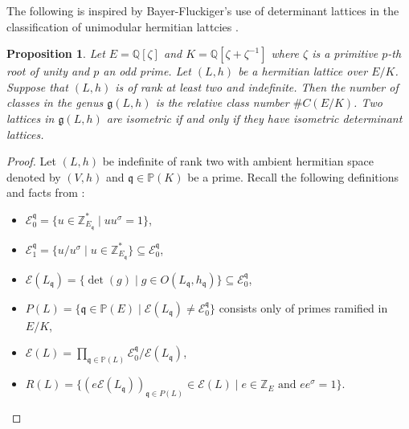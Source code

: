 \documentclass{amsart}
\theoremstyle{definition}
\theoremstyle{plain}
\newtheorem{proposition}[definition]{Proposition}
\newcommand{\QQ}{\mathbb{Q}}
\newcommand{\ZZ}{\mathbb{Z}}
\begin{document}
The following is inspired by Bayer-Fluckiger's use of determinant lattices in the
classification of unimodular hermitian lattcies \cite{fluckiger:unimodular}.
\begin{proposition}\label{prop:genus2}
 Let $E = \QQ[\zeta]$ and $K=\QQ[\zeta + \zeta^{-1}]$ where $\zeta$ is a primitive $p$-th root of unity and $p$ an odd prime.
 Let $(L,h)$ be a hermitian lattice over $E/K$. Suppose that $(L,h)$ is of rank at least two and indefinite.
 Then the number of classes in the genus $\mathfrak{g}(L,h)$ is the relative class number $\#C(E/K)$.
 Two lattices in $\mathfrak{g}(L,h)$ are isometric if and only if they have isometric determinant lattices.
\end{proposition}
\begin{proof}
Let $(L,h)$ be indefinite of rank two with ambient hermitian space denoted by $(V,h)$ and
 $\mathfrak{q} \in \mathbb{P}(K)$ be a prime. Recall the following definitions and facts from \cite{kirschmer:determinants}:
\begin{itemize}
\setlength{\itemsep}{2pt}
 \item $\mathcal{E}_0^\mathfrak{q}=\{u \in \ZZ_{E_\mathfrak{q}}^* \mid uu^\sigma =1\}$,
 \item $\mathcal{E}_1^\mathfrak{q}=\{u/u^{\sigma} \mid u \in \ZZ_{E_\mathfrak{q}}^*\} \subseteq \mathcal{E}_0^\mathfrak{q}$,
 \item $\mathcal{E}(L_\mathfrak{q})=\{\det(g) \mid g \in O(L_\mathfrak{q},h_\mathfrak{q}) \}\subseteq \mathcal{E}_0^\mathfrak{q}$,
 \item $P(L)=\{\mathfrak{q} \in \mathbb{P}(E) \mid \mathcal{E}(L_\mathfrak{q}) \neq \mathcal{E}_0^\mathfrak{q}\}$ consists only of primes ramified in $E/K$,
 \item $\mathcal{E}(L) = \prod_{\mathfrak{q} \in \mathbb{P}(L)} \mathcal{E}_0^\mathfrak{q}/\mathcal{E}(L_\mathfrak{q})$,
 \item $R(L)=\{(e \mathcal{E}(L_\mathfrak{q}))_{\mathfrak{q}\in P(L)} \in \mathcal{E}(L) \mid e \in \ZZ_E \mbox{ and } ee^\sigma=1\}$.
\end{itemize}


\end{proof}
\end{document}
